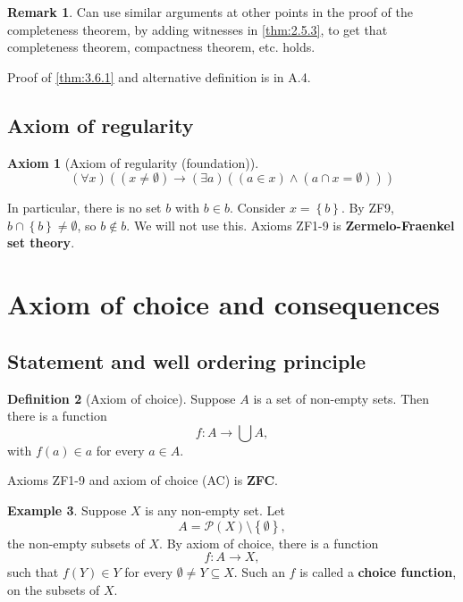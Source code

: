 \documentclass{article}
\newcommand{\rb}[1]{\left( #1 \right)}
\newcommand{\cb}[1]{\left\{ #1 \right\}}
\newcommand{\andb}[2]{\rb{#1 \land #2}}
\newcommand{\impb}[2]{\rb{#1 \rightarrow #2}}
\newcommand{\fab}[1]{\rb{\forall #1}}
\newcommand{\teb}[1]{\rb{\exists #1}}
\newcommand{\eqb}[2]{\rb{#1 = #2}}
\newcommand{\neb}[2]{\rb{#1 \ne #2}}
\newcommand{\inb}[2]{\rb{#1 \in #2}}
\theoremstyle{definition}\newtheorem{definition}{Definition}[subsection]
\theoremstyle{definition}\newtheorem{remark1}[definition]{Remark}
\theoremstyle{definition}\newtheorem{example1}[definition]{Example}
\theoremstyle{definition}\newtheorem*{remark2}{Remark}
\theoremstyle{definition}\newtheorem*{example2}{Example}
\theoremstyle{definition}\newtheorem*{note}{Note}
\theoremstyle{definition}\newtheorem*{notation}{Notation}
\newtheorem{axiom}{Axiom}
\begin{document}

\begin{remark1}
Can use similar arguments at other points in the proof of the completeness theorem, by adding witnesses in \ref{thm:2.5.3}, to get that completeness theorem, compactness theorem, etc. holds.
\end{remark1}

Proof of \ref{thm:3.6.1} and alternative definition is in A.4.

\subsection{Axiom of regularity}

\begin{axiom}[Axiom of regularity (foundation)]
$$ \fab{x}\impb{\neb{x}{\emptyset}}{\teb{a}\andb{\inb{a}{x}}{\eqb{a \cap x}{\emptyset}}} $$
\end{axiom}

In particular, there is no set $ b $ with $ b \in b $. Consider $ x = \cb{b} $. By ZF9, $ b \cap \cb{b} \ne \emptyset $, so $ b \notin b $. We will not use this. Axioms ZF1-9 is \textbf{Zermelo-Fraenkel set theory}.

\pagebreak

\section{Axiom of choice and consequences}

\subsection{Statement and well ordering principle}

\begin{definition}[Axiom of choice]
Suppose $ A $ is a set of non-empty sets. Then there is a function
$$ f : A \to \bigcup A, $$
with $ f\rb{a} \in a $ for every $ a \in A $.
\end{definition}

Axioms ZF1-9 and axiom of choice (AC) is \textbf{ZFC}.

\begin{example1}
Suppose $ X $ is any non-empty set. Let
$$ A = \mathcal{P}\rb{X} \setminus \cb{\emptyset}, $$
the non-empty subsets of $ X $. By axiom of choice, there is a function
$$ f : A \to X, $$
such that $ f\rb{Y} \in Y $ for every $ \emptyset \ne Y \subseteq X $. Such an $ f $ is called a \textbf{choice function}, on the subsets of $ X $.
\end{example1}
\end{document}
